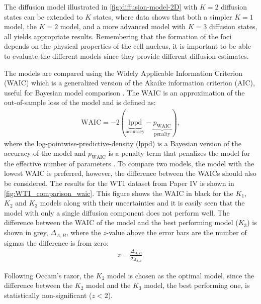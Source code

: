 The diffusion model illustrated in \autoref{fig:diffusion-model-2D} with $K=2$ diffusion states can be extended to $K$ states, where data shows that both a simpler $K=1$ model, the $K=2$ model, and a more advanced model with $K=3$ diffusion states, all yields appropriate results. Remembering that the formation of the foci depends on the physical properties of the cell nucleus, it is important to be able to evaluate the different models since they provide different diffusion estimates.

The models are compared using the Widely Applicable Information Criterion (WAIC) \parencite{watanabeAsymptoticEquivalenceBayes2010a} which is a generalized version of the Akaike information criterion (AIC), useful for Bayesian model comparison \parencite{gelmanUnderstandingPredictiveInformation2014a}. The WAIC is an approximation of the out-of-sample loss of the model and is defined as:
\begin{align}
    \mathrm{WAIC} = -2(\underbrace{\mathrm{lppd}}_\textrm{accuracy} - \underbrace{p_\mathrm{WAIC}}_\textrm{penalty}),
\end{align}
where the log-pointwise-predictive-density ($\mathrm{lppd}$) is a Bayesian version of the accuracy of the model and $p_\mathrm{WAIC}$ is a penalty term that penalizes the model for the effective number of parameters \parencite{mcelreathStatisticalRethinkingBayesian2020}. To compare two models, the model with the lowest WAIC is preferred, however, the difference between the WAICs should also be considered. The results for the WT1 dataset from Paper IV is shown in \autoref{fig:WT1_comparison_waic}. This figure shows the WAIC in black for the $K_1$, $K_2$ and $K_3$ models along with their uncertainties and it is easily seen that the model with only a single diffusion component does not perform well. The difference between the WAIC of the model and the best performing model ($K_3$) is shown in grey, $\Delta_{A,B}$, where the $z$-value above the error bars are the number of sigmas the difference is from zero:
\begin{align}
    z = \frac{\Delta_{A,B}}{\sigma_{\Delta_{A,B}}}.
\end{align}

Following Occam's razor, the $K_2$ model is chosen as the optimal model, since the difference between the $K_2$ model and the $K_3$ model, the best performing one, is statistically non-significant ($z<2$).


